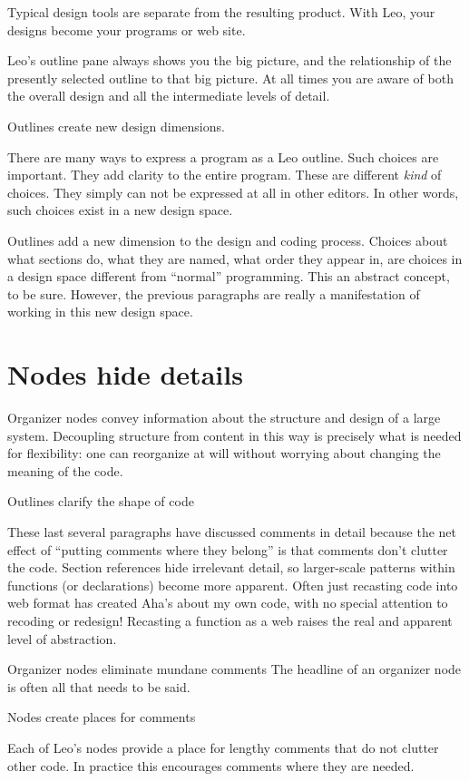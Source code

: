 \documentclass[a4paper,10pt,english]{sphinxmanual}
\begin{document}
Typical design tools are separate from the resulting product. With Leo, your
designs become your programs or web site.

Leo's outline pane always shows you the big picture, and the relationship of the
presently selected outline to that big picture. At all times you are aware of
both the overall design and all the intermediate levels of detail.

Outlines create new design dimensions.

There are many ways to express a program as a Leo outline. Such choices are
important. They add clarity to the entire program. These are different \emph{kind} of
choices. They simply can not be expressed at all in other editors. In other
words, such choices exist in a new design space.

Outlines add a new dimension to the design and coding process. Choices about
what sections do, what they are named, what order they appear in, are choices in
a design space different from ``normal'' programming. This an abstract concept, to
be sure. However, the previous paragraphs are really a manifestation of
working in this new design space.


\section{Nodes hide details}
\label{design:nodes-hide-details}
Organizer nodes convey information about the structure and design of a large
system. Decoupling structure from content in this way is precisely what is
needed for flexibility: one can reorganize at will without worrying about
changing the meaning of the code.

Outlines clarify the shape of code

These last several paragraphs have discussed comments in detail because the net
effect of ``putting comments where they belong'' is that comments don't clutter
the code. Section references hide irrelevant detail, so larger-scale patterns
within functions (or declarations) become more apparent. Often just recasting
code into web format has created Aha's about my own code, with no special
attention to recoding or redesign! Recasting a function as a web raises the real
and apparent level of abstraction.

Organizer nodes eliminate mundane comments
The headline of an organizer node is often all that needs to be said.

Nodes create places for comments

Each of Leo's nodes provide a place for lengthy comments that do not clutter
other code. In practice this encourages comments where they are needed.
\end{document}
